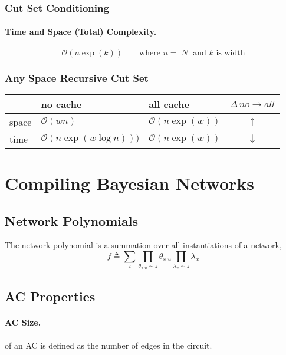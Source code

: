 \documentclass[11pt]{article}
\begin{document}
\subsubsection{Cut Set Conditioning}
\paragraph{Time and Space (Total) Complexity.}
\begin{equation}
	\mathcal O (n \exp (k))\quad \quad \text{where $n = |N|$ and $k$ is width}
\end{equation}

\subsubsection{Any Space Recursive Cut Set}
\begin{table}[H]
\centering
\begin{tabular}{l|l|l|c} \label{tab:anytime comparison}
      & no cache                           & all cache                 & $\Delta\, no \rightarrow all$ \\ \hline
space & $\mathcal O (wn)$                  & $\mathcal O (n \exp (w))$ & $\uparrow$       \\
time  & $\mathcal O (n \exp (w \log n )))$ & $\mathcal O (n \exp (w))$ & $\downarrow$    
\end{tabular}
\end{table}


\section{Compiling Bayesian Networks}
\subsection{Network Polynomials}
The network polynomial is a summation over all instantiations of a network, 
\begin{equation}
	f \triangleq \sum_z \prod_{\theta_{x | u} \sim z }\theta _{x | u} \prod _{\lambda _x \sim z} \lambda_x
\end{equation}

\subsection{AC Properties}
\paragraph{AC Size.}
of an AC is defined as the number of edges in the circuit.  
\end{document}
